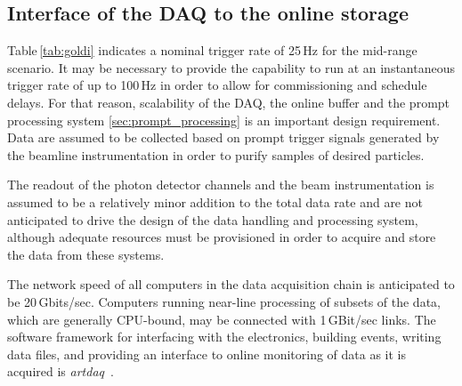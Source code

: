\subsection{Interface of the DAQ to the online storage}
\label{sec:DAQ_online_interface}



Table\,\ref{tab:goldi} indicates a nominal trigger rate of 25\,Hz for
the mid-range scenario. It may be necessary to provide the capability
to run at  an instantaneous trigger rate of up to 100\,Hz in order to
allow for commissioning and schedule delays. For that reason,
scalability of the DAQ, the online buffer and the prompt processing system
\ref{sec:prompt_processing} is an important design requirement.
 Data are assumed to be
collected based on prompt trigger signals generated by the beamline
instrumentation in order to purify samples of desired particles.

The readout of the photon detector channels
 and the beam
instrumentation is assumed to be a relatively minor addition to the
total data rate and are not anticipated to drive the design of the
data handling and processing system, although adequate resources must
be provisioned in order to acquire and store the data from these
systems.

The network speed of all computers in the data acquisition
chain is anticipated to be 20\,Gbits/sec. 
 Computers running near-line
processing of subsets of the data, which are generally CPU-bound, may
be connected with 1\,GBit/sec links.  The software framework for
interfacing with the electronics, building events, writing data files,
and providing an interface to online monitoring of data as it is
acquired is {\it artdaq}~\cite{artdaq}.


